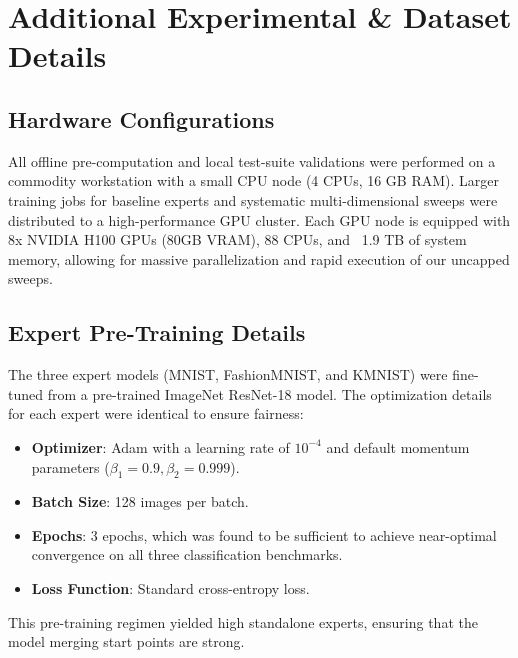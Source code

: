\documentclass{article}
\theoremstyle{plain}
\theoremstyle{definition}
\theoremstyle{remark}
\begin{document}
\section{Additional Experimental \& Dataset Details}
\label{appendix-details}

\subsection{Hardware Configurations}
All offline pre-computation and local test-suite validations were performed on a commodity workstation with a small CPU node (4 CPUs, 16 GB RAM). Larger training jobs for baseline experts and systematic multi-dimensional sweeps were distributed to a high-performance GPU cluster. Each GPU node is equipped with 8x NVIDIA H100 GPUs (80GB VRAM), 88 CPUs, and ~1.9 TB of system memory, allowing for massive parallelization and rapid execution of our uncapped sweeps.

\subsection{Expert Pre-Training Details}
The three expert models (MNIST, FashionMNIST, and KMNIST) were fine-tuned from a pre-trained ImageNet ResNet-18 model. The optimization details for each expert were identical to ensure fairness:
\begin{itemize}
    \item \textbf{Optimizer}: Adam with a learning rate of $10^{-4}$ and default momentum parameters ($\beta_1=0.9, \beta_2=0.999$).
    \item \textbf{Batch Size}: 128 images per batch.
    \item \textbf{Epochs}: 3 epochs, which was found to be sufficient to achieve near-optimal convergence on all three classification benchmarks.
    \item \textbf{Loss Function}: Standard cross-entropy loss.
\end{itemize}
This pre-training regimen yielded high standalone experts, ensuring that the model merging start points are strong.



\end{document}
